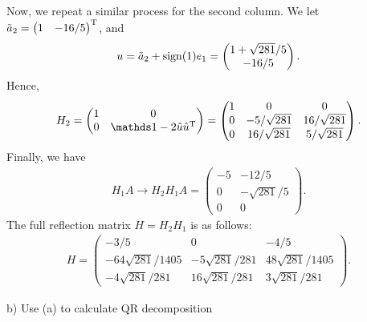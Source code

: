 Now, we repeat a similar process for the second column.
We let $\tilde{a}_{2} = \begin{pmatrix} 1 & -16/5 \end{pmatrix}^{\rm T}$, and 
\begin{eqnarray}
    \label{eq:u2}
    u = \tilde{a}_{2} + {\rm sign}(1)e_{1} = \begin{pmatrix}
    1 + \sqrt{281}/5 \\ -16/5
    \end{pmatrix}
.\end{eqnarray}
Hence,
\begin{eqnarray}
    \label{eq:H2}
    H_2 = \begin{pmatrix}
        1 & 0 \\
        0 & \id - 2 \hat{u} \hat{u}^{\rm T} 
    \end{pmatrix}
    = \begin{pmatrix}
        1 & 0 & 0 \\
        0 & -5/\sqrt{281} & 16/\sqrt{281} \\
        0 & 16/\sqrt{281} & 5/\sqrt{281}
    \end{pmatrix}
.\end{eqnarray}
Finally, we have 
\begin{eqnarray}
    \label{eq:H2H1A}
    H_1 A \rightarrow H_2 H_1 A = \begin{pmatrix}
    -5 & -12/5 \\
    0 & -\sqrt{281}/5 \\
    0 & 0 
    \end{pmatrix}  
.\end{eqnarray}
The full reflection matrix $H = H_2 H_1$ is as follows:
\begin{eqnarray}
    \label{eq:H-mat}
    H = \begin{pmatrix}
        -3/5 & 0 & -4/5 \\
        -64\sqrt{281}/1405 & -5\sqrt{281}/281 & 48\sqrt{281}/1405 \\
        -4\sqrt{281}/281 & 16\sqrt{281}/281 & 3\sqrt{281}/281
    \end{pmatrix}
.\end{eqnarray}


b) Use (a) to calculate QR decomposition

